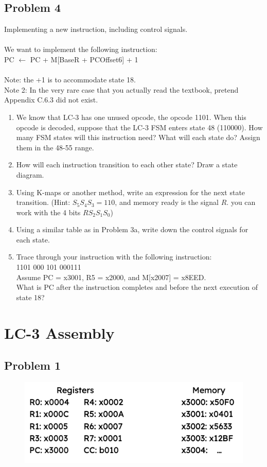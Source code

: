 \documentclass{article}
\begin{document}
\subsection*{Problem 4}
Implementing a new instruction, including control signals.\\\\
We want to implement the following instruction: \\
PC $\longleftarrow$ PC + M[BaseR + PCOffset6] + 1 \\\\
Note: the +1 is to accommodate state 18. \\
Note 2: In the very rare case that you actually read the textbook, pretend Appendix C.6.3 did not exist.\\
\begin{enumerate}[label=\alph*]
\item We know that LC-3 has one unused opcode, the opcode 1101. When this opcode is decoded, suppose that the LC-3 FSM enters state 48 (110000). How many FSM states will this instruction need? What will each state do? Assign them in the 48-55 range.
\item How will each instruction transition to each other state? Draw a state diagram.
\item Using K-maps or another method, write an expression for the next state transition. (Hint: $S_5S_4S_3 = 110$, and memory ready is the signal $R$. you can work with the 4 bits $RS_2S_1S_0$)
\item Using a similar table as in Problem 3a, write down the control signals for each state.
\item Trace through your instruction with the following instruction: \\
1101 000 101 000111 \\
Assume PC = x3001, R5 = x2000, and M[x2007] = x8EED. \\
What is PC after the instruction completes and before the next execution of state 18?

\end{enumerate}

\newpage
\section*{LC-3 Assembly}
\subsection*{Problem 1}
\begin{figure}[!h]
    \centering
    \includegraphics[width=1\textwidth]{figures/lc3_q1.png}
\end{figure}
\end{document}
